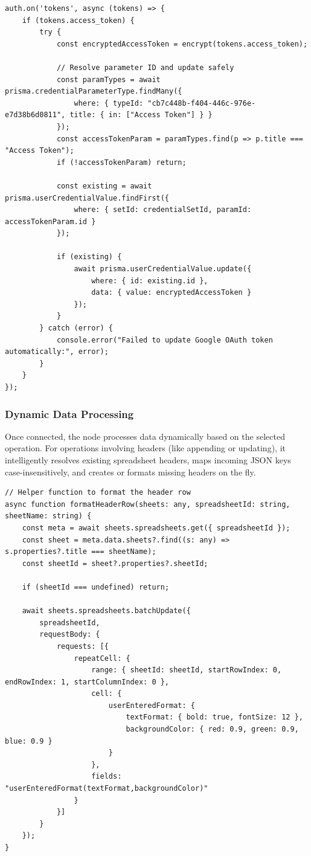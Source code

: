 \begin{lstlisting}[caption={Real-time OAuth Token Refresh Logic}]
auth.on('tokens', async (tokens) => {
    if (tokens.access_token) {
        try {
            const encryptedAccessToken = encrypt(tokens.access_token);
            
            // Resolve parameter ID and update safely
            const paramTypes = await prisma.credentialParameterType.findMany({
                where: { typeId: "cb7c448b-f404-446c-976e-e7d38b6d0811", title: { in: ["Access Token"] } }
            });
            const accessTokenParam = paramTypes.find(p => p.title === "Access Token");
            if (!accessTokenParam) return;

            const existing = await prisma.userCredentialValue.findFirst({
                where: { setId: credentialSetId, paramId: accessTokenParam.id }
            });

            if (existing) {
                await prisma.userCredentialValue.update({
                    where: { id: existing.id },
                    data: { value: encryptedAccessToken }
                });
            }
        } catch (error) {
            console.error("Failed to update Google OAuth token automatically:", error);
        }
    }
});
\end{lstlisting}

\subsubsection{Dynamic Data Processing}

Once connected, the node processes data dynamically based on the selected operation. For operations involving headers (like appending or updating), it intelligently resolves existing spreadsheet headers, maps incoming JSON keys case-insensitively, and creates or formats missing headers on the fly.

\begin{lstlisting}[caption={Header Formatting Utility}]
// Helper function to format the header row
async function formatHeaderRow(sheets: any, spreadsheetId: string, sheetName: string) {
    const meta = await sheets.spreadsheets.get({ spreadsheetId });
    const sheet = meta.data.sheets?.find((s: any) => s.properties?.title === sheetName);
    const sheetId = sheet?.properties?.sheetId;

    if (sheetId === undefined) return;

    await sheets.spreadsheets.batchUpdate({
        spreadsheetId,
        requestBody: {
            requests: [{
                repeatCell: {
                    range: { sheetId: sheetId, startRowIndex: 0, endRowIndex: 1, startColumnIndex: 0 },
                    cell: {
                        userEnteredFormat: {
                            textFormat: { bold: true, fontSize: 12 },
                            backgroundColor: { red: 0.9, green: 0.9, blue: 0.9 }
                        }
                    },
                    fields: "userEnteredFormat(textFormat,backgroundColor)"
                }
            }]
        }
    });
}
\end{lstlisting}